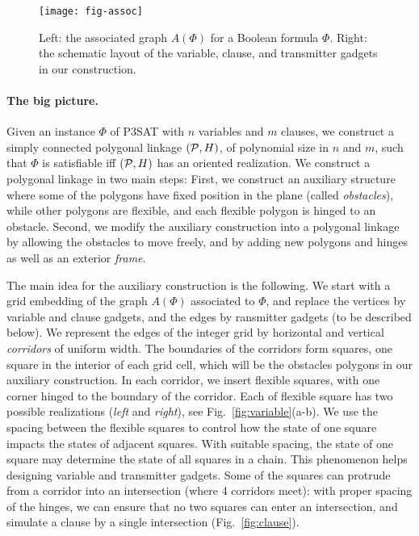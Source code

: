 \documentclass{llncs}
\newcommand{\PP}{{\cal P}} %
\begin{document}
\begin{figure}[htbp]
	\centering
	\texttt{[image: fig-assoc]}
	\caption[]{Left: the associated graph $A(\Phi)$ for a Boolean formula $\Phi$.
Right: the schematic layout of the variable, clause, and transmitter gadgets in our construction.}
	\label{fig:assoc}
\end{figure}


\paragraph{The big picture.}
Given an instance $\Phi$ of P3SAT with $n$ variables and $m$ clauses, we construct a simply connected polygonal linkage $(\PP,H)$, of polynomial size in $n$ and $m$, such that $\Phi$ is satisfiable iff $(\PP,H)$ has an oriented realization. We construct a polygonal linkage  in two main steps: First, we construct an auxiliary structure where some of the polygons have fixed position in the plane (called \emph{obstacles}), while other polygons are flexible, and each flexible polygon is hinged to an obstacle. Second, we modify the auxiliary construction into a polygonal linkage by allowing the obstacles to move freely, and by adding new polygons and hinges as well as an exterior \emph{frame}.

The main idea for the auxiliary construction is the following. We start with a grid embedding of the graph $A(\Phi)$ associated to $\Phi$, and replace the vertices by variable and clause gadgets, and the edges by ransmitter gadgets (to be described below). We represent the edges of the integer grid by horizontal and vertical \emph{corridors} of uniform width. The boundaries of the corridors form squares, one square in the interior of each grid cell, which will be the obstacles polygons in our auxiliary construction. In each corridor, we insert flexible squares, with one corner hinged to
the boundary of the corridor. Each of flexible square has two possible realizations (\emph{left} and \emph{right}), see Fig.~\ref{fig:variable}(a-b). We use the spacing between the flexible squares to control how the state of one square impacts the states of adjacent squares. With suitable spacing, the state of one square may determine the state of all squares in a chain. This phenomenon helps designing variable and transmitter gadgets. Some of the squares can protrude from a corridor into an intersection (where 4 corridors meet): with proper spacing of the hinges, we can ensure that no two squares can enter an intersection, and simulate a clause by a single intersection (Fig.~\ref{fig:clause}).
\end{document}
